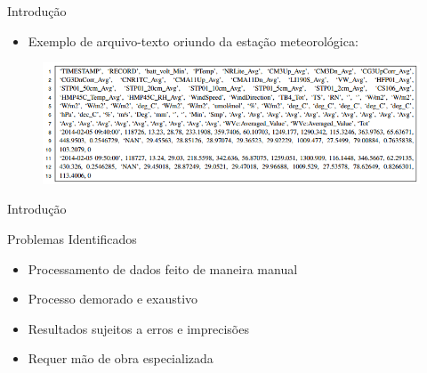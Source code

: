 \begin{frame}{Introdução}
\begin{itemize}
\item Exemplo de arquivo-texto oriundo da estação meteorológica:
\end{itemize}

\begin{figure}
\centering
\includegraphics[width=0.9\linewidth]{./img/dat}
\end{figure}

\end{frame}

\begin{frame}{Introdução}

\begin{block}{Problemas Identificados}
	\begin{itemize}
		\item Processamento de dados feito de maneira manual
		\item Processo demorado e exaustivo
		\item Resultados sujeitos a erros e imprecisões
		\item Requer mão de obra especializada
	\end{itemize}
\end{block}
\ \ \newline

\end{frame}

